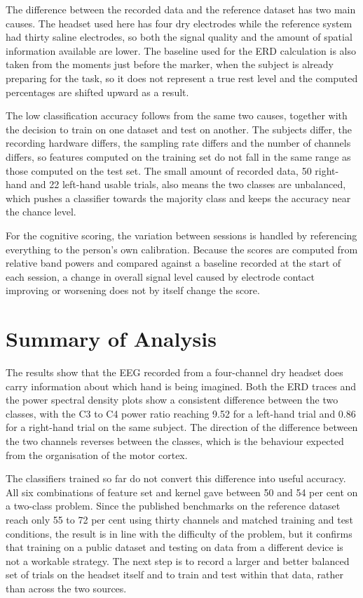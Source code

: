 The difference between the recorded data and the reference dataset has two main causes. The
headset used here has four dry electrodes while the reference system had thirty saline
electrodes, so both the signal quality and the amount of spatial information available are
lower. The baseline used for the ERD calculation is also taken from the moments just before
the marker, when the subject is already preparing for the task, so it does not represent a
true rest level and the computed percentages are shifted upward as a result.

The low classification accuracy follows from the same two causes, together with the decision
to train on one dataset and test on another. The subjects differ, the recording hardware
differs, the sampling rate differs and the number of channels differs, so features computed
on the training set do not fall in the same range as those computed on the test set. The
small amount of recorded data, 50 right-hand and 22 left-hand usable trials, also means the
two classes are unbalanced, which pushes a classifier towards the majority class and keeps
the accuracy near the chance level.

For the cognitive scoring, the variation between sessions is handled by referencing
everything to the person's own calibration. Because the scores are computed from relative
band powers and compared against a baseline recorded at the start of each session, a change
in overall signal level caused by electrode contact improving or worsening does not by
itself change the score.

\section{Summary of Analysis}

The results show that the EEG recorded from a four-channel dry headset does carry
information about which hand is being imagined. Both the ERD traces and the power spectral
density plots show a consistent difference between the two classes, with the C3 to C4 power
ratio reaching 9.52 for a left-hand trial and 0.86 for a right-hand trial on the same
subject. The direction of the difference between the two channels reverses between the
classes, which is the behaviour expected from the organisation of the motor cortex.

The classifiers trained so far do not convert this difference into useful accuracy. All six
combinations of feature set and kernel gave between 50 and 54 per cent on a two-class
problem. Since the published benchmarks on the reference dataset reach only 55 to 72 per
cent using thirty channels and matched training and test conditions, the result is in line
with the difficulty of the problem, but it confirms that training on a public dataset and
testing on data from a different device is not a workable strategy. The next step is to
record a larger and better balanced set of trials on the headset itself and to train and
test within that data, rather than across the two sources.

